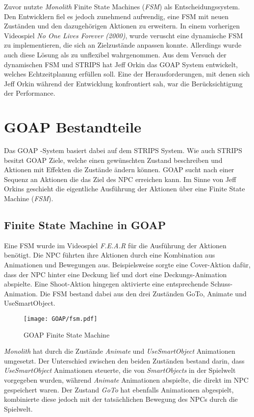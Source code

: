 Zuvor nutzte \textit{Monolith} Finite State Machines (\textit{FSM}) als Entscheidungssystem. Den Entwicklern fiel es jedoch zunehmend aufwendig, eine FSM mit neuen Zuständen und den dazugehörigen Aktionen zu erweitern. In einem vorherigen Videospiel \textit{No One Lives Forever (2000)}, wurde veruscht eine dynamische FSM zu implementieren, die sich an Zielzustände anpassen konnte. Allerdings wurde auch diese Lösung als zu unflexibel wahrgenommen. Aus dem Versuch der dynamischen FSM und STRIPS hat Jeff Orkin das GOAP System entwickelt, welches Echtzeitplanung erfüllen soll. Eine der Herausforderungen, mit denen sich Jeff Orkin während der Entwicklung konfrontiert sah, war die Berücksichtigung der Performance.\autocite{retro_fear}



\section{GOAP Bestandteile}

Das GOAP -System basiert dabei auf dem STRIPS System. Wie auch STRIPS besitzt GOAP Ziele, welche einen gewünschten Zustand beschreiben und Aktionen mit Effekten die Zustände ändern können. GOAP sucht nach einer Sequenz an Aktionen die das Ziel des NPC erreichen kann. Im Sinne von Jeff Orkins geschieht die eigentliche Ausführung der Aktionen über eine Finite State Machine (\textit{FSM}).


\subsection{Finite State Machine in GOAP}

Eine FSM wurde im Videospiel \textit{F.E.A.R} für die Ausführung der Aktionen benötigt. Die NPC führten ihre Aktionen durch eine Kombination aus Animationen und Bewegungen aus. Beispielsweise sorgte eine Cover-Aktion dafür, dass der NPC hinter eine Deckung lief und dort eine Deckungs-Animation abspielte. Eine Shoot-Aktion hingegen aktivierte eine entsprechende Schuss-Animation. Die FSM bestand dabei aus den drei Zuständen GoTo, Animate und UseSmartObject. 
\begin{figure}[h]
  \centering
  \texttt{[image: GOAP/fsm.pdf]}
	\captionsetup{justification=justified, format=plain}
  \caption{GOAP Finite State Machine}
  \label{fig:Goap FSM}
\end{figure}

\textit{Monolith} hat durch die Zustände \textit{Animate} und \textit{UseSmartObject} Animationen umgesetzt. Der Unterschied zwischen den beiden Zuständen bestand darin, dass \textit{UseSmartObject} Animationen steuerte, die von \textit{SmartObjects} in der Spielwelt vorgegeben wurden, während \textit{Animate} Animationen abspielte, die direkt im NPC gespeichert waren. Der Zustand \textit{GoTo} hat ebenfalls Animationen abgespielt, kombinierte diese jedoch mit der tatsächlichen Bewegung des NPCs durch die Spielwelt.

